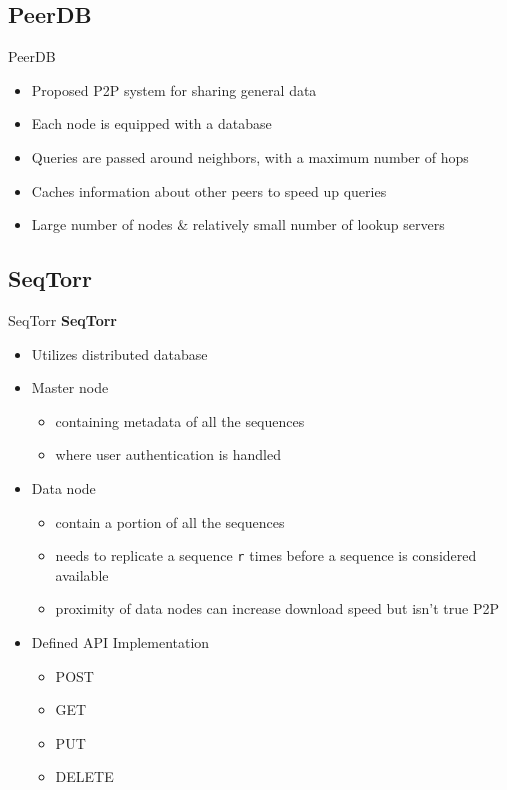 \documentclass{beamer}
\begin{document}
    \subsection{PeerDB}
    \begin{frame}{PeerDB}
        \begin{itemize}
            \item Proposed P2P system for sharing general data
            \item Each node is equipped with a database
            \item Queries are passed around neighbors, with a maximum number of hops
            \item Caches information about other peers to speed up queries
            \item Large number of nodes & relatively small number of lookup servers
            \cite{peerdb}
        \end{itemize}
    \end{frame}

    
    \subsection{SeqTorr}
    \begin{frame}{SeqTorr}
    \textbf{SeqTorr} \cite{seqtorr}
    \begin{itemize}
        \item Utilizes distributed database
        \item Master node
        \begin{itemize}
            \item containing metadata of all the sequences
            \item where user authentication is handled
        \end{itemize}
        \item Data node
        \begin{itemize}
            \item contain a portion of all the sequences
            \item needs to replicate a sequence \texttt{r} times before a sequence is considered available
            \item proximity of data nodes can increase download speed but isn't true P2P
        \end{itemize}
        \item Defined API Implementation
        \begin{itemize}
            \item POST
            \item GET
            \item PUT
            \item DELETE
        \end{itemize}

    \end{itemize}
    \end{frame}
    
\end{document}
